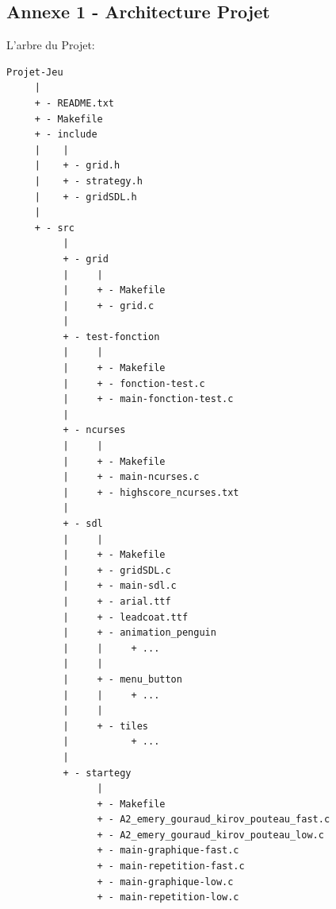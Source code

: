 \documentclass[a4paper]{article}
\begin{document}
\subsection{Annexe 1 - Architecture Projet}
\label{sec-7-1}
\noindent
L'arbre du Projet:
{\footnotesize
\begin{verbatim}
Projet-Jeu 
     |                                                                                      
     + - README.txt                                             
     + - Makefile                                           
     + - include                                      
     |    |                                      
     |    + - grid.h                                      
     |    + - strategy.h                                      
     |    + - gridSDL.h                                      
     |
     + - src
          |                                           
          + - grid                                           
          |     |                                      
          |     + - Makefile                                      
          |     + - grid.c                                      
          |
          + - test-fonction                                      
          |     |                                      
          |     + - Makefile                                      
          |     + - fonction-test.c                                      
          |     + - main-fonction-test.c                                      
          |                                          
          + - ncurses
          |     |
          |     + - Makefile                                      
          |     + - main-ncurses.c                                      
          |     + - highscore_ncurses.txt                                      
          |                                           
          + - sdl
          |     |                                      
          |     + - Makefile                                      
          |     + - gridSDL.c                                      
          |     + - main-sdl.c
          |     + - arial.ttf                                      
          |     + - leadcoat.ttf                                      
          |     + - animation_penguin                                     
          |     |     + ...                               
          |     |                                      
          |     + - menu_button                                     
          |     |     + ...                               
          |     |                                      
          |     + - tiles
          |           + ...                               
          |                                           
          + - startegy
                |                                      
                + - Makefile                                      
                + - A2_emery_gouraud_kirov_pouteau_fast.c
                + - A2_emery_gouraud_kirov_pouteau_low.c
                + - main-graphique-fast.c
                + - main-repetition-fast.c
                + - main-graphique-low.c
                + - main-repetition-low.c
\end{verbatim}
}
\newpage
\end{document}

